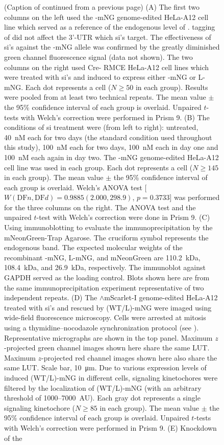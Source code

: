 \begin{figure}
    \noindent\justifying (Caption of  continued from a previous page) (A) The first two columns on the left used the -mNG genome-edited HeLa-A12 cell line which served as a reference of the endogenous level of .  tagging of  did not affect the 3'-UTR which si's target. The effectiveness of si's against the -mNG allele was confirmed by the greatly diminished green channel fluorescence signal (data not shown). The two columns on the right used Cre- RMCE HeLa-A12 cell lines which were treated with si's and induced to express either -mNG or \textDelta{}L-mNG. Each dot represents a cell ($N \geq 50$ in each group). Results were pooled from at least two technical repeats. The mean value $\pm$ the 95\% confidence interval of each group is overlaid. Unpaired $t$-tests with Welch's correction were performed in Prism 9. (B) The conditions of si treatment were (from left to right): untreated, \SI{40}{nM} each for two days (the standard condition used throughout this study), \SI{100}{nM} each for two days, \SI{100}{nM} each in day one and \SI{100}{nM} each again in day two. The -mNG genome-edited HeLa-A12 cell line was used in each group. Each dot represents a cell ($N \geq 145$ in each group). The mean value $\pm$ the 95\% confidence interval of each group is overlaid. Welch's ANOVA test [$W(\text{DF}n, \text{DF}d) = 0.9885 (2.000, 298.9)$, $p = 0.3733$] was performed for the three columns on the right. The ANOVA test and the unpaired $t$-test with Welch's correction were done in Prism 9. (C) Using immunoblotting to evaluate the immunoprecipitation by the mNeonGreen-Trap Agarose. The cruciform symbol represents the endogenous  band. The expected molecular weights of the recombinant -mNG, \textDelta{}L-mNG, and mNeonGreen are \SI{110.2}{kDa}, \SI{108.4}{kDa}, and \SI{26.9}{kDa}, respectively. The immunoblot against GAPDH served as the loading control. Blots shown here are from the same immunoprecipitation experiment representative of two independent repeats. (D) The $\wedge$mScarlet-I genome-edited HeLa-A12 treated with si's and rescued by (WT/\textDelta{}L)-mNG were imaged using wide-field fluorescence microscopy. Cells were arrested at mitosis using a thymidine--nocodazole synchronization protocol (see ). Representative micrographs are shown in the top panel. Maximum $z$-projected green channel images shown here share the same LUT. Maximum $z$-projected red channel images shown here also share the same LUT. Scale bar, \SI{10}{\micro m}. Due to various expression levels of induced (WT/\textDelta{}L)-mNG in different cells, signaling kinetochores were filtered by the localization of (WT/\textDelta{}L)-mNG (with an arbitrary threshold of 1000--\SI{7000}{AU}). Each gray dot represents a single signaling kinetochore ($N \geq 85$ in each group). The mean value $\pm$ the 95\% confidence interval of each group is overlaid. Unpaired $t$-tests with Welch's correction were performed in Prism 9. (E) Knockdown of the 
\end{figure}

